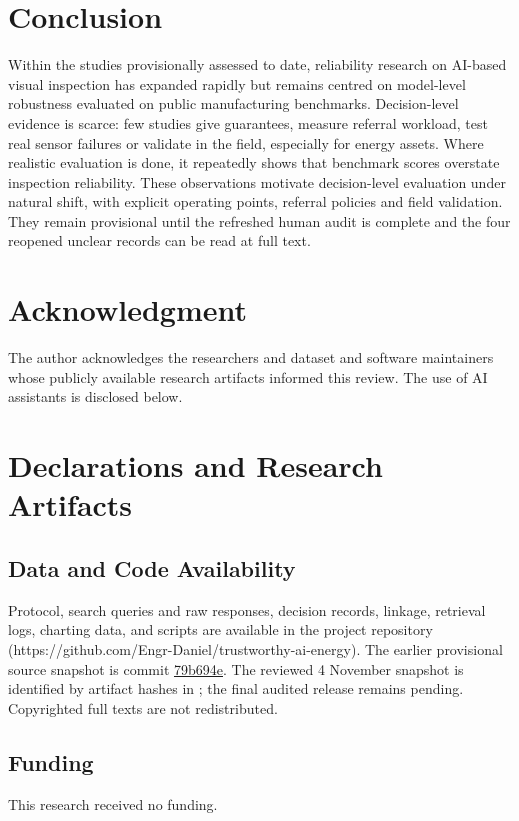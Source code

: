 \documentclass[journal]{IEEEtran}
\begin{document}
\section{Conclusion}
\label{sec:conclusion}
Within the \nIncluded{} studies provisionally assessed to date, reliability research on AI-based visual inspection has expanded rapidly but remains centred on model-level robustness evaluated on public manufacturing benchmarks. Decision-level evidence is scarce: few studies give guarantees, measure referral workload, test real sensor failures or validate in the field, especially for energy assets. Where realistic evaluation is done, it repeatedly shows that benchmark scores overstate inspection reliability. These observations motivate decision-level evaluation under natural shift, with explicit operating points, referral policies and field validation. They remain provisional until the refreshed human audit is complete and the four reopened unclear records can be read at full text.

\section*{Acknowledgment}
The author acknowledges the researchers and dataset and software maintainers whose publicly available research artifacts informed this review. The use of AI assistants is disclosed below.

\section*{Declarations and Research Artifacts}
\subsection*{Data and Code Availability}
Protocol, search queries and raw responses, decision records, linkage, retrieval logs, charting data, and scripts are available in the project repository (https://github.com/Engr-Daniel/trustworthy-ai-energy). The earlier provisional source snapshot is commit \href{https://github.com/Engr-Daniel/trustworthy-ai-energy/commit/79b694e63cdb07f81625a74f257dd91e44101f52}{79b694e}. The reviewed 4 November snapshot is identified by artifact hashes in ; the final audited release remains pending. Copyrighted full texts are not redistributed.
\subsection*{Funding}
This research received no funding.
\end{document}

